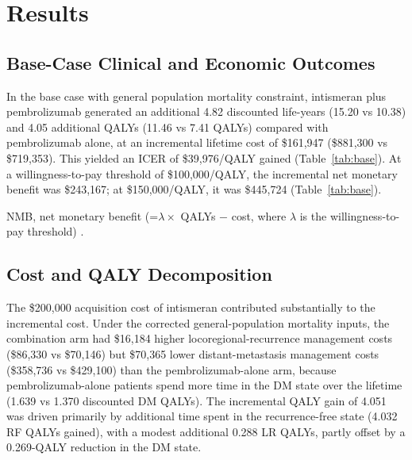 \documentclass[12pt,a4paper]{article}
\begin{document}
\section{Results}

\subsection{Base-Case Clinical and Economic Outcomes}

In the base case with general population mortality constraint, intismeran plus \mbox{pembrolizumab} generated an additional 4.82 discounted life-years (15.20 vs 10.38) and 4.05 additional QALYs (11.46 vs 7.41 QALYs) compared with \mbox{pembrolizumab} alone, at an incremental lifetime cost of \$161,947 (\$881,300 vs \$719,353). This yielded an ICER of \$39,976/QALY gained (Table~\ref{tab:base}). At a willingness-to-pay threshold of \$100,000/QALY, the incremental net monetary benefit was \$243,167; at \$150,000/QALY, it was \$445,724 (Table~\ref{tab:base}).



NMB, net monetary benefit (=$\lambda \times$ QALYs $-$ cost, where $\lambda$ is the willingness-to-pay threshold) \cite{stinnett1998}.


\subsection{Cost and QALY Decomposition}

The \$200,000 acquisition cost of intismeran contributed substantially to the incremental cost. Under the corrected general-population mortality inputs, the combination arm had \$16,184 higher locoregional-recurrence management costs (\$86,330 vs \$70,146) but \$70,365 lower distant-metastasis management costs (\$358,736 vs \$429,100) than the \mbox{pembrolizumab}-alone arm, because \mbox{pembrolizumab}-alone patients spend more time in the DM state over the lifetime (1.639 vs 1.370 discounted DM QALYs). The incremental QALY gain of 4.051 was driven primarily by additional time spent in the recurrence-free state (4.032 RF QALYs gained), with a modest additional 0.288 LR QALYs, partly offset by a 0.269-QALY reduction in the DM state.
\end{document}
